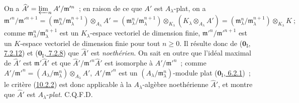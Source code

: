 On a $\widehat A'=\varprojlim_n A'/\mathfrak m'^{n}$~; en raison de ce que
$A'$ est $A_\lambda$-plat, on a
\[
  \mathfrak m'^{n}/\mathfrak m'^{n+1}
  =(\mathfrak m_\lambda^n/\mathfrak m_\lambda^{n+1})
    \otimes_{A_\lambda}A'
  =(\mathfrak m_\lambda^n/\mathfrak m_\lambda^{n+1})
    \otimes_{K_\lambda}(K_\lambda\otimes_{A_\lambda}A')
  =(\mathfrak m_\lambda^n/\mathfrak m_\lambda^{n+1})
    \otimes_{K_\lambda}K~;
\]
comme $\mathfrak m_\lambda^n/\mathfrak m_\lambda^{n+1}$ est un
$K_\lambda$-espace vectoriel de dimension finie,
$\mathfrak m'^{n}/\mathfrak m'^{n+1}$ est un $K$-espace vectoriel de
dimension finie pour tout $n\geq0$. Il résulte donc de
(\hyperref[0.7.2.12-fr]{$\mathbf{0}_{\mathrm I}$, 7.2.12}) et
(\hyperref[0.7.2.8-fr]{$\mathbf{0}_{\mathrm I}$, 7.2.8}) que $\widehat A'$ est
\emph{noethérien}. On sait en outre que l'idéal maximal de $\widehat A'$ est
$\mathfrak m'\widehat A'$ et que
$\widehat A'/\mathfrak m'^{n}\widehat A'$ est isomorphe à
$A'/\mathfrak m'^{n}$~; comme
$A'/\mathfrak m'^{n}=(A_\lambda/\mathfrak m_\lambda^n)
\otimes_{A_\lambda}A'$, $A'/\mathfrak m'^{n}$ est un
$(A_\lambda/\mathfrak m_\lambda^n)$-module plat
(\hyperref[0.6.2.1-fr]{$\mathbf{0}_{\mathrm I}$, 6.2.1})~; le critère
(\hyperref[0.10.2.2-fr]{10.2.2}) est donc applicable à la
$A_\lambda$-algèbre noethérienne $\widehat A'$, et montre que $\widehat A'$
est $A_\lambda$-\emph{plat}. C.Q.F.D.

